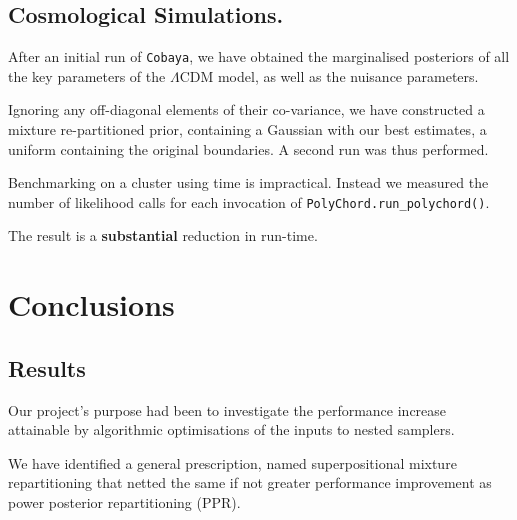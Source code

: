 \documentclass[usenatbib]{mnras}
\begin{document}
\subsection{Cosmological Simulations.}\label{sec:orgb81c159}
After an initial run of \texttt{Cobaya}, we have obtained the marginalised
posteriors of all the key parameters of the \(\Lambda\)CDM model,
as well as the nuisance parameters.

Ignoring any off-diagonal elements of their co-variance, we have
constructed a mixture re-partitioned prior, containing a Gaussian
with our best estimates, a uniform containing the original
boundaries. A second run was thus performed.

Benchmarking on a cluster using time is impractical. Instead we
measured the number of likelihood calls for each invocation of
\texttt{PolyChord.run\_polychord()}.

The result is a \textbf{substantial} reduction in run-time.




\section{Conclusions}\label{sec:orgdf2cbd9}

\subsection{Results}\label{sec:orgc48c55d}
Our project's purpose had been to investigate the performance
increase attainable by algorithmic optimisations of the inputs to
nested samplers.

We have identified a general prescription, named superpositional
mixture repartitioning that netted the same if not greater
performance improvement as power posterior repartitioning (PPR).
\end{document}
